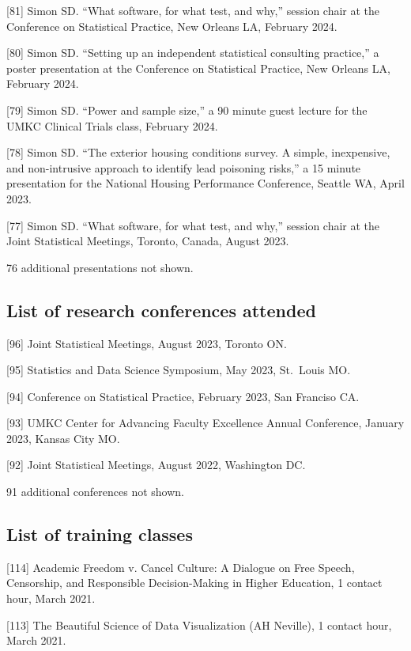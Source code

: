 \documentclass[
  12pt,
]{article}
\begin{document}
{[}81{]} Simon SD. ``What software, for what test, and why,'' session
chair at the Conference on Statistical Practice, New Orleans LA,
February 2024.

{[}80{]} Simon SD. ``Setting up an independent statistical consulting
practice,'' a poster presentation at the Conference on Statistical
Practice, New Orleans LA, February 2024.

{[}79{]} Simon SD. ``Power and sample size,'' a 90 minute guest lecture
for the UMKC Clinical Trials class, February 2024.

{[}78{]} Simon SD. ``The exterior housing conditions survey. A simple,
inexpensive, and non-intrusive approach to identify lead poisoning
risks,'' a 15 minute presentation for the National Housing Performance
Conference, Seattle WA, April 2023.

{[}77{]} Simon SD. ``What software, for what test, and why,'' session
chair at the Joint Statistical Meetings, Toronto, Canada, August 2023.

76 additional presentations not shown.

\subsection{List of research conferences
attended}\label{list-of-research-conferences-attended}

{[}96{]} Joint Statistical Meetings, August 2023, Toronto ON.

{[}95{]} Statistics and Data Science Symposium, May 2023, St.~Louis MO.

{[}94{]} Conference on Statistical Practice, February 2023, San Franciso
CA.

{[}93{]} UMKC Center for Advancing Faculty Excellence Annual Conference,
January 2023, Kansas City MO.

{[}92{]} Joint Statistical Meetings, August 2022, Washington DC.

91 additional conferences not shown.

\subsection{List of training classes}\label{list-of-training-classes}

{[}114{]} Academic Freedom v. Cancel Culture: A Dialogue on Free Speech,
Censorship, and Responsible Decision-Making in Higher Education, 1
contact hour, March 2021.

{[}113{]} The Beautiful Science of Data Visualization (AH Neville), 1
contact hour, March 2021.
\end{document}
